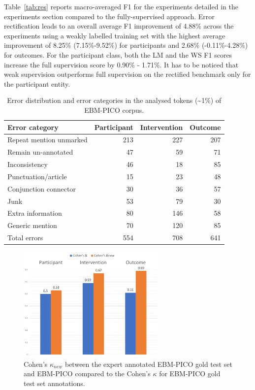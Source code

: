 \documentclass[10.7pt,]{article}
\let\oldparagraph\paragraph
\renewcommand{\paragraph}[1]{\oldparagraph{#1}\mbox{}}
\begin{document}
Table~\ref{tab:res} reports macro-averaged F1 for the experiments detailed in the experiments section compared to the fully-supervised approach.
Error rectification leads to an overall average F1 improvement of 4.88\% across the experiments using a weakly labelled training set with the highest average improvement of 8.25\% (7.15\%-9.52\%) for participants and 2.68\% (-0.11\%-4.28\%) for outcomes. 
For the participant class, both the LM and the WS F1 scores increase the full supervision score by 0.90\% - 1.71\%.
It has to be noticed that weak supervision outperforms full supervision on the rectified benchmark only for the participant entity.
%
\begin{table}[!ht]
    \centering
    \begin{tabular}{|l|r|r|r|}
    \hline
        Error category & Participant & Intervention & Outcome \\ \hline
        Repeat mention unmarked & 213 & 227 & 207 \\ 
        Remain un-annotated & 47 & 59 & 71 \\ 
        Inconsistency & 46 & 18 & 85 \\ 
        Punctuation/article & 15 & 23 & 48 \\ 
        Conjunction connector & 30 & 36 & 57 \\ 
        Junk & 53 & 79 & 30 \\ 
        Extra information & 80 & 146 & 58 \\ 
        Generic mention & 70 & 120 & 85 \\ \hline
        Total errors & 554 & 708 & 641 \\ \hline
    \end{tabular}
    \caption{\label{tab:errordist} Error distribution and error categories in the analysed tokens (\textasciitilde1\%) of EBM-PICO corpus.}
\end{table}
%
%
\begin{figure}[!h]
\centering
\includegraphics[width=0.65\textwidth]{figures/cohens_kappa.pdf}
\caption{\label{fig:agreement} Cohen's $\kappa_{new}$ between the expert annotated EBM-PICO gold test set and EBM-PICO compared to the Cohen's $\kappa$ for EBM-PICO gold test set annotations.}
\end{figure}
\end{document}
